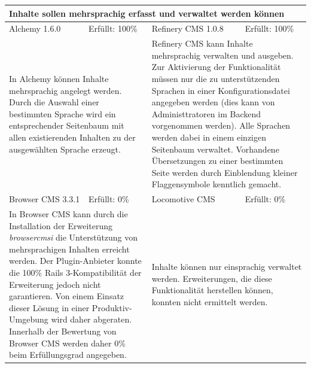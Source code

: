 \newline
\newline
\newline
\begin{tabular}[!ht]{|l|l|l|l|}
\hline
\multicolumn{4}{|p{15cm}|}{\textbf{Inhalte sollen mehrsprachig erfasst und verwaltet werden können}} \\
\hline
  Alchemy 1.6.0 & \cellcolor{green}Erfüllt: 100\% & Refinery CMS 1.0.8 & \cellcolor{green}Erfüllt: 100\% \\
  \hline
  \multicolumn{2}{|p{7.5cm}|}{In Alchemy können Inhalte mehrsprachig angelegt werden. Durch die Auswahl einer bestimmten Sprache wird ein entsprechender Seitenbaum mit allen existierenden Inhalten zu der ausgewählten Sprache erzeugt.}
   & \multicolumn{2}{p{7.5cm}|}{Refinery CMS kann Inhalte mehrsprachig verwalten und ausgeben. Zur Aktivierung der Funktionalität müssen nur die zu unterstützenden Sprachen in einer Konfigurationsdatei angegeben werden (dies kann von Administtratoren im Backend vorgenommen werden). Alle Sprachen werden dabei in einem einzigen Seitenbaum verwaltet. Vorhandene Übersetzungen zu einer bestimmten Seite werden durch Einblendung kleiner Flaggensymbole kenntlich gemacht.} \\
  \hline
  Browser CMS 3.3.1 & \cellcolor{red}Erfüllt: 0\% & Locomotive CMS & \cellcolor{red}Erfüllt: 0\% \\
  \hline
  \multicolumn{2}{|p{7.5cm}|}{In Browser CMS kann  durch die Installation der Erweiterung \emph{browsercmsi} die Unterstützung von mehrsprachigen Inhalten erreicht werden. Der Plugin-Anbieter konnte die 100\% Rails 3-Kompatibilität der Erweiterung jedoch nicht garantieren. Von einem Einsatz dieser Lösung in einer Produktiv-Umgebung wird daher abgeraten. Innerhalb der Bewertung von Browser CMS werden daher 0\% beim Erfüllungsgrad angegeben.} & \multicolumn{2}{p{7.5cm}|}{Inhalte können nur einsprachig verwaltet werden. Erweiterungen, die diese Funktionalität herstellen können, konnten nicht ermittelt werden.} \\
\hline
\end{tabular}
\newline
\newline
\newline
